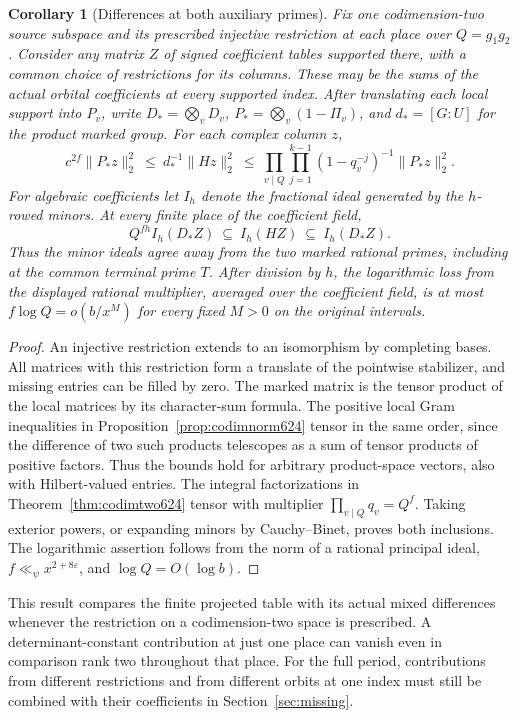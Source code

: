 \documentclass[a4paper,11pt]{article}
\newtheorem{corollary}[proposition]{Corollary}
\theoremstyle{definition}
\theoremstyle{remark}
\numberwithin{equation}{section}
\begin{document}
\begin{corollary}[Differences at both auxiliary primes]
\leavevmode\label{cor:codimmarked624}
Fix one codimension-two source subspace and its prescribed
injective restriction at each place over \(Q=g_1g_2\). Consider
any matrix \(Z\) of signed coefficient tables supported there,
with a common choice of restrictions for its columns. These may
be the sums of the actual orbital coefficients at every
supported index. After translating each local support into
\(P_v\), write \(D_*=\bigotimes_vD_v\),
\(P_*=\bigotimes_v(1-\Pi_v)\), and \(d_*=[G:U]\) for the
product marked group. For each complex column \(z\),
\[
    c^{2f}\|P_*z\|_2^2
    \ \le\ d_*^{-1}\|Hz\|_2^2
    \ \le\ \prod_{v\mid Q}\prod_{j=1}^{k-1}(1-q_v^{-j})^{-1}
                                  \|P_*z\|_2^2 .
\]
For algebraic coefficients let \(I_h\) denote the fractional
ideal generated by the \(h\)-rowed minors. At every finite
place of the coefficient field,
\[
     Q^{fh} I_h(D_*Z)\ \subseteq\ I_h(HZ)\ \subseteq\ I_h(D_*Z).
\]
Thus the minor ideals agree away from the two marked rational
primes, including at the common terminal prime \(T\). After
division by \(h\), the logarithmic loss from the displayed
rational multiplier, averaged over the coefficient field, is at
most \(f\log Q=o(b/x^M)\) for every fixed \(M>0\) on the
original intervals.
\end{corollary}
\begin{proof}
An injective restriction extends to an isomorphism by completing
bases. All matrices with this restriction form a translate of
the pointwise stabilizer, and missing entries can be filled by
zero. The marked matrix is the tensor product of the local
matrices by its character-sum formula. The positive local
Gram inequalities in Proposition~\ref{prop:codimnorm624} tensor
in the same order, since the difference of two such products
telescopes as a sum of tensor products of positive factors.
Thus the bounds hold for arbitrary product-space vectors, also
with Hilbert-valued entries. The integral factorizations in
Theorem~\ref{thm:codimtwo624} tensor with multiplier
\(\prod_{v\mid Q}q_v=Q^f\). Taking exterior powers, or
expanding minors by Cauchy--Binet, proves both inclusions.
The logarithmic assertion follows from the norm of a rational
principal ideal, \(f\ll_\psi x^{2+8\varepsilon}\), and
\(\log Q=O(\log b)\).
\end{proof}

This result compares the finite projected table with its actual
mixed differences whenever the restriction on a codimension-two
space is prescribed. A determinant-constant contribution at
just one place can vanish even in comparison rank two throughout
that place. For the full period, contributions from different
restrictions and from different orbits at one index must still
be combined with their coefficients in Section~\ref{sec:missing}.
\end{document}
